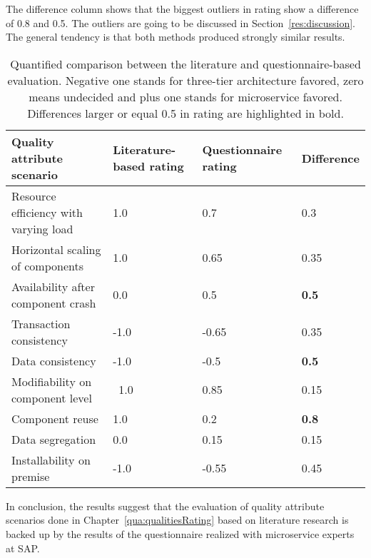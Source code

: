 The difference column shows that the biggest outliers in rating show a difference of 0.8 and 0.5.
The outliers are going to be discussed in Section~\ref{res:discussion}.
The general tendency is that both methods produced strongly similar results.

\begin{table}[h]
  \renewcommand{\arraystretch}{1.2}
  \centering
  \sffamily
  \begin{footnotesize}
    \begin{tabular}{l l l l}
    \toprule
    \textbf{Quality attribute scenario} & \textbf{Literature-based rating} & \textbf{Questionnaire rating} & \textbf{Difference}\\
    \midrule
    Resource efficiency with varying load	&	1.0 	& 0.7 & 0.3\\
    Horizontal scaling of components	&	1.0		&	0.65  & 0.35\\
    Availability after component crash	&	0.0	&	0.5  & \textbf{0.5}\\
    Transaction consistency	&	-1.0		&	-0.65  & 0.35 \\
    Data consistency	&	-1.0		&	-0.5  & \textbf{0.5} \\
    Modifiability on component level	&	~1.0		&	0.85  & 0.15 \\    
    Component reuse	&	1.0		&	0.2  & \textbf{0.8} \\    
    Data segregation	&	0.0		&	0.15  & 0.15 \\    
    Installability on premise	&	-1.0		&	-0.55  & 0.45 \\                
    \bottomrule
    \end{tabular}
  \end{footnotesize}
  \rmfamily
  \caption[Quantified comparison between the literature and questionnaire-based evaluation.]{Quantified comparison between the literature and questionnaire-based evaluation. Negative one stands for three-tier architecture favored, zero means undecided and plus one stands for microservice favored. Differences larger or equal 0.5 in rating are highlighted in bold.}
  \label{res:table}
\end{table}


In conclusion, the results suggest that the evaluation of quality attribute scenarios done in Chapter~\ref{qua:qualitiesRating} based on literature research is backed up by the results of the questionnaire realized with microservice experts at SAP.

\clearpage

